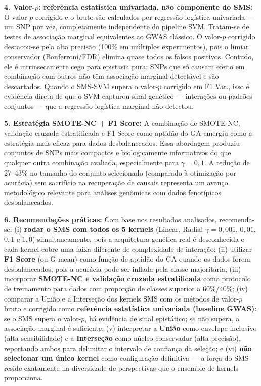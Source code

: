 \documentclass[12pt,a4paper]{article}
\newcommand{\novo}[1]{\textcolor{corNova}{#1}}
\begin{document}
\novo{\textbf{4. Valor-$p$: referência estatística univariada, não componente do SMS:} O valor-$p$ corrigido e o bruto são calculados por regressão logística univariada --- um SNP por vez, completamente independente do pipeline SVM. Tratam-se de testes de associação marginal equivalentes ao GWAS clássico. O valor-$p$ corrigido destacou-se pela alta precisão (100\% em múltiplos experimentos), pois o limiar conservador (Bonferroni/FDR) elimina quase todos os falsos positivos. Contudo, ele é intrinsecamente cego para epistasia pura: SNPs que só causam efeito em combinação com outros não têm associação marginal detectável e são descartados. Quando o SMS-SVM supera o valor-$p$ corrigido em F1 Var., isso é evidência direta de que o SVM capturou sinal genético --- interações ou padrões conjuntos --- que a regressão logística marginal não detectou.}

\novo{\textbf{5. Estratégia SMOTE-NC + F1 Score:} A combinação de SMOTE-NC, validação cruzada estratificada e F1 Score como aptidão do GA emergiu como a estratégia mais eficaz para dados desbalanceados. Essa abordagem produziu conjuntos de SNPs mais compactos e biologicamente informativos do que qualquer outra combinação avaliada, especialmente para $\gamma = 0{,}1$. A redução de 27--43\% no tamanho do conjunto selecionado (comparado à otimização por acurácia) sem sacrifício na recuperação de causais representa um avanço metodológico relevante para análises genômicas com dados fenotípicos desbalanceados.}

\novo{\textbf{6. Recomendações práticas:} Com base nos resultados analisados, recomenda-se: (i) \textbf{rodar o SMS com todos os 5 kernels} (Linear, Radial $\gamma = 0{,}001$, $0{,}01$, $0{,}1$ e $1{,}0$) simultaneamente, pois a arquitetura genética real é desconhecida e cada kernel cobre uma faixa diferente de complexidade de interação; (ii) utilizar \textbf{F1 Score} (ou G-mean) como função de aptidão do GA quando os dados forem desbalanceados, pois a acurácia pode ser inflada pela classe majoritária; (iii) incorporar \textbf{SMOTE-NC e validação cruzada estratificada} como protocolo de treinamento para dados com proporção de classes superior a 60\%/40\%; (iv) comparar a União e a Interseção dos kernels SMS com os métodos de valor-$p$ bruto e corrigido como \textbf{referência estatística univariada (baseline GWAS)}: se o SMS supera o valor-$p$, há evidência de sinal epistático; se não supera, a associação marginal é suficiente; (v) interpretar a \textbf{União} como envelope inclusivo (alta sensibilidade) e a \textbf{Interseção} como núcleo conservador (alta precisão), reportando ambos para delimitar o intervalo de confiança da seleção; e (vi) \textbf{não selecionar um único kernel} como configuração definitiva --- a força do SMS reside exatamente na diversidade de perspectivas que o ensemble de kernels proporciona.}
\end{document}
